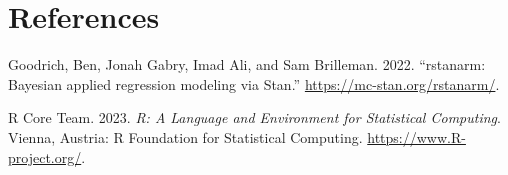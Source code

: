 \documentclass[
  letterpaper,
  DIV=11,
  numbers=noendperiod]{scrartcl}
\newlength{\cslhangindent}
\newenvironment{CSLReferences}[2] %
 {\begin{list}{}{%
  \setlength{\itemindent}{0pt}
  \setlength{\leftmargin}{0pt}
  \setlength{\parsep}{0pt}
  \ifodd #1
   \setlength{\leftmargin}{\cslhangindent}
   \setlength{\itemindent}{-1\cslhangindent}
  \fi
  \setlength{\itemsep}{#2\baselineskip}}}
 {\end{list}}
\begin{document}
\newpage

\section*{References}\label{references}

\label{refs}
\begin{CSLReferences}{1}{0}
Goodrich, Ben, Jonah Gabry, Imad Ali, and Sam Brilleman. 2022.
{``{rstanarm: {Bayesian} applied regression modeling via {Stan}}.''}
\url{https://mc-stan.org/rstanarm/}.

R Core Team. 2023. \emph{{R: A Language and Environment for Statistical
Computing}}. Vienna, Austria: R Foundation for Statistical Computing.
\url{https://www.R-project.org/}.

\end{CSLReferences}
\end{document}
